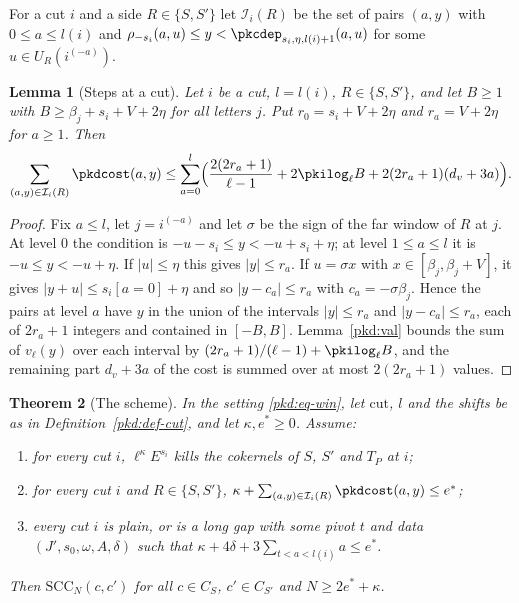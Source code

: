 \documentclass[10pt]{amsart}
\newtheorem{theorem}{Theorem}[section]
\newtheorem{lemma}[theorem]{Lemma}
\theoremstyle{definition}
\theoremstyle{remark}
\begin{document}
For a cut $i$ and a side $R\in\{S,S'\}$ let $\mathcal I_i(R)$ be the set of pairs $(a,y)$ with $0\le
a\le l(i)$ and $\rho_{-s_i}(a,u)\le y<\pkcdep_{s_i,\eta,l(i)+1}(a,u)$ for some $u\in U_R(i^{(-a)})$.

\begin{lemma}[Steps at a cut]\label{pkd:steps}
Let $i$ be a cut, $l=l(i)$, $R\in\{S,S'\}$, and let $B\ge1$ with $B\ge\beta_j+s_i+V+2\eta$ for all
letters $j$. Put $r_0=s_i+V+2\eta$ and $r_a=V+2\eta$ for $a\ge1$. Then
\[
\sum_{(a,y)\in\mathcal I_i(R)}\pkdcost(a,y)\le\sum_{a=0}^{l}\Bigl(\frac{2(2r_a+1)}{\ell-1}
+2\pkilog_\ell B+2(2r_a+1)(d_v+3a)\Bigr).
\]
\end{lemma}

\begin{proof}
Fix $a\le l$, let $j=i^{(-a)}$ and let $\sigma$ be the sign of the far window of $R$ at $j$. At level
$0$ the condition is $-u-s_i\le y<-u+s_i+\eta$; at level $1\le a\le l$ it is $-u\le y<-u+\eta$. If
$|u|\le\eta$ this gives $|y|\le r_a$. If $u=\sigma x$ with $x\in[\beta_j,\beta_j+V]$, it gives
$|y+u|\le s_i[a=0]+\eta$ and so $|y-c_a|\le r_a$ with $c_a=-\sigma\beta_j$. Hence the pairs at level
$a$ have $y$ in the union of the intervals $|y|\le r_a$ and $|y-c_a|\le r_a$, each of $2r_a+1$
integers and contained in $[-B,B]$. Lemma~\ref{pkd:val} bounds the sum of $v_\ell(y)$ over each
interval by $(2r_a+1)/(\ell-1)+\pkilog_\ell B$, and the remaining part $d_v+3a$ of the cost is summed
over at most $2(2r_a+1)$ values.
\end{proof}

\begin{theorem}[The scheme]\label{pkd:scheme}
In the setting \eqref{pkd:eq-win}, let $\mathrm{cut}$, $l$ and the shifts be as in
Definition~\ref{pkd:def-cut}, and let $\kappa,e^*\ge0$. Assume:
\begin{enumerate}
\item[(K)] for every cut $i$, $\ell^\kappa E^{s_i}$ kills the cokernels of $S$, $S'$ and $T_P$ at $i$;
\item[(C)] for every cut $i$ and $R\in\{S,S'\}$, $\kappa+\sum_{(a,y)\in\mathcal I_i(R)}\pkdcost(a,y)\le e^*$;
\item[(G)] every cut $i$ is plain, or is a long gap with some pivot $t$ and data
$(J',s_0,\omega,A,\delta)$ such that $\kappa+4\delta+3\sum_{t<a<l(i)}a\le e^*$.
\end{enumerate}
Then $\mathrm{SCC}_N(c,c')$ for all $c\in C_S$, $c'\in C_{S'}$ and $N\ge2e^*+\kappa$.
\end{theorem}
\end{document}
